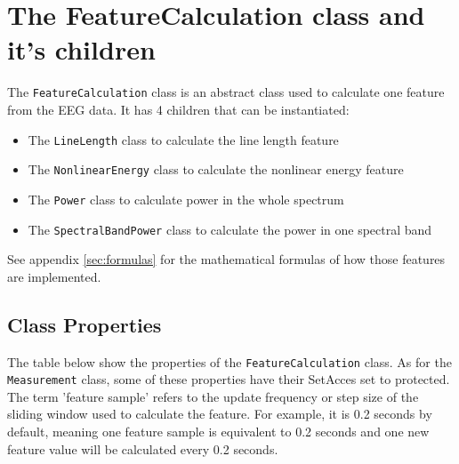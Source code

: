 \documentclass[usletter, 11pt]{extarticle}
\begin{document}
\section{The FeatureCalculation class and it's children}

The \verb|FeatureCalculation| class is an abstract class used to calculate one feature from the EEG data. It has 4 children that can be instantiated:
\begin{itemize}
	\item The \verb|LineLength| class to calculate the line length feature
	\item The \verb|NonlinearEnergy| class to calculate the nonlinear energy feature
	\item The \verb|Power| class to calculate power in the whole spectrum
	\item The \verb|SpectralBandPower| class to calculate the power in one spectral band
\end{itemize}
See appendix \ref{sec:formulas} for the mathematical formulas of how those features are implemented.

\subsection{Class Properties}

The table below show the properties of the \texttt{FeatureCalculation} class. As for the \verb|Measurement| class, some of these properties have their SetAcces set to protected. The term 'feature sample' refers to the update frequency or step size of the sliding window used to calculate the feature. For example, it is 0.2 seconds by default, meaning one feature sample is equivalent to 0.2 seconds and one new feature value will be calculated every 0.2 seconds.
\end{document}
